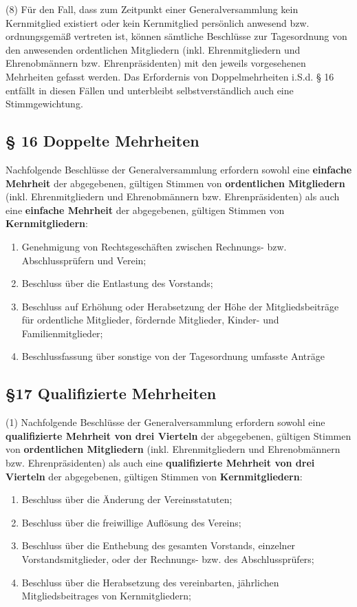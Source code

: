 \documentclass[11pt,a4paper]{article}
\begin{document}
(8)
Für den Fall, dass zum Zeitpunkt einer Generalversammlung kein Kernmitglied existiert oder kein Kernmitglied persönlich anwesend bzw. ordnungsgemäß vertreten ist, können sämtliche Beschlüsse zur Tagesordnung von den anwesenden ordentlichen Mitgliedern (inkl. Ehrenmitgliedern und Ehrenobmännern bzw. Ehrenpräsidenten) mit den jeweils vorgesehenen Mehrheiten gefasst werden.
Das Erfordernis von Doppelmehrheiten i.S.d. § 16 entfällt in diesen Fällen und unterbleibt selbstverständlich auch eine Stimmgewichtung.

\subsection{§ 16
Doppelte Mehrheiten}
Nachfolgende Beschlüsse der Generalversammlung erfordern sowohl eine \textbf{einfache Mehrheit} der abgegebenen, gültigen Stimmen von \textbf{ordentlichen Mitgliedern} (inkl. Ehrenmitgliedern und Ehrenobmännern bzw. Ehrenpräsidenten) als auch eine \textbf{einfache Mehrheit} der abgegebenen, gültigen Stimmen von \textbf{Kernmitgliedern}:

\begin{enumerate}[label=\alph*)]
\item
Genehmigung von Rechtsgeschäften zwischen Rechnungs- bzw. Abschlussprüfern und Verein;
\item
Beschluss über die Entlastung des Vorstands;
\item
Beschluss auf Erhöhung oder Herabsetzung der Höhe der Mitgliedsbeiträge für ordentliche Mitglieder, fördernde Mitglieder, Kinder- und Familienmitglieder;
\item
Beschlussfassung über sonstige von der Tagesordnung umfasste Anträge
\end{enumerate}

\subsection{§17 Qualifizierte Mehrheiten}

(1)
Nachfolgende Beschlüsse der Generalversammlung erfordern sowohl eine \textbf{qualifizierte Mehrheit von drei Vierteln} der abgegebenen, gültigen Stimmen von \textbf{ordentlichen Mitgliedern} (inkl. Ehrenmitgliedern und Ehrenobmännern bzw. Ehrenpräsidenten) als auch eine \textbf{qualifizierte Mehrheit von drei Vierteln} der abgegebenen, gültigen Stimmen von \textbf{Kernmitgliedern}:

\begin{enumerate}[label=\alph*)]
\item
Beschluss über die Änderung der Vereinsstatuten;
\item
Beschluss über die freiwillige Auflösung des Vereins;
\item
Beschluss über die Enthebung des gesamten Vorstands, einzelner Vorstandsmitglieder, oder der Rechnungs- bzw. des Abschlussprüfers;
\item
Beschluss über die Herabsetzung des vereinbarten, jährlichen Mitgliedsbeitrages von Kernmitgliedern;
\end{enumerate}
\end{document}
